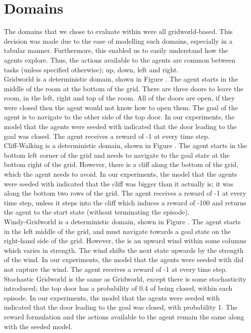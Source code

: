 \section{Domains}
The domains that we chose to evaluate within were all gridworld-based. This decision was made due to the ease of modelling such domains, especially in a tabular manner. Furthermore, this enabled us to easily understand how the agents explore. Thus, the actions available to the agents are common between tasks (unless specified otherwise); up, down, left and right.
\\Gridworld is a deterministic domain, shown in Figure {}. The agent starts in the middle of the room at the bottom of the grid. There are three doors to leave the room, in the left, right and top of the room. All of the doors are open, if they were closed then the agent would not know how to open them. The goal of the agent is to navigate to the other side of the top door. In our experiments, the model that the agents were seeded with indicated that the door leading to the goal was closed. The agent receives a reward of -1 at every time step.
\\Cliff-Walking \cite{Sutton1998} is a deterministic domain, shown in Figure {}. The agent starts in the bottom left corner of the grid and needs to navigate to the goal state at the bottom right of the grid. However, there is a cliff along the bottom of the grid, which the agent needs to avoid. In our experiments, the model that the agents were seeded with indicated that the cliff was bigger than it actually is; it was along the bottom two rows of the grid. The agent receives a reward of -1 at every time step, unless it steps into the cliff which induces a reward of -100 and returns the agent to the start state (without terminating the episode).
\\Windy-Gridworld \cite{Sutton1998} is a deterministic domain, shown in Figure {}. The agent starts in the left middle of the grid, and must navigate towards a goal state on the right-hand side of the grid. However, the is an upward wind within some columns which varies in strength. The wind shifts the next state upwards by the strength of the wind. In our experiments, the model that the agents were seeded with did not capture the wind. The agent receives a reward of -1 at every time step.
\\Stochastic Gridworld is the same as Gridworld, except there is some stochasticity introduced; the top door has a probability of 0.4 of being closed, within each episode. In our experiments, the model that the agents were seeded with indicated that the door leading to the goal was closed, with probability 1. The reward formulation and the actions available to the agent remain the same along with the seeded model.
